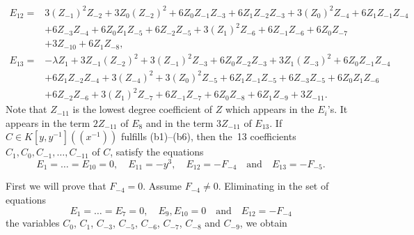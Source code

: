 \documentclass[reqno,a4paper]{amsart}
\theoremstyle{definition}
\theoremstyle{remark}
\begin{document}
\begin{align*}
E_ {12} =& 3 (Z_ {-1})^2 Z_ {-2} + 3 Z_ 0 (Z_ {-2})^2 + 6 Z_ 0 Z_ {-1} Z_ {-3}
+ 6 Z_ 1 Z_ {-2} Z_ {-3} + 3 (Z_ 0)^2 Z_ {-4} + 6 Z_ 1 Z_ {-1} Z_ {-4}\\
& + 6 Z_ {-3} Z_ {-4} +6 Z_ 0 Z_ 1 Z_ {-5}  + 6 Z_ {-2} Z_ {-5}
+ 3 (Z_ 1)^2 Z_ {-6} + 6 Z_ {-1} Z_ {-6} + 6 Z_ 0 Z_ {-7}\\
& +3 Z_ {-10}+ 6 Z_ 1 Z_ {-8},\\
E_ {13} =& -\lambda Z_ 1  + 3 Z_ {-1} (Z_ {-2})^2 + 3 (Z_ {-1})^2 Z_ {-3}
+ 6 Z_ 0 Z_ {-2} Z_ {-3} + 3 Z_ 1 (Z_ {-3})^2 + 6 Z_ 0 Z_ {-1} Z_ {-4}\\
  & + 6 Z_ 1 Z_ {-2} Z_ {-4} + 3 (Z_ {-4})^2
  + 3 (Z_ 0)^2 Z_ {-5} + 6 Z_ 1 Z_ {-1} Z_ {-5} + 6 Z_ {-3} Z_ {-5} + 6 Z_ 0 Z_ 1 Z_ {-6} \\
  & + 6 Z_ {-2} Z_ {-6} + 3 (Z_ 1)^2 Z_ {-7}
  + 6 Z_ {-1} Z_ {-7} + 6 Z_ 0 Z_ {-8} + 6 Z_ 1 Z_ {-9}+ 3 Z_ {-11}.
\end{align*}
Note that $Z_{-11}$ is the lowest degree coefficient of $Z$ which appears in the $E_i$'s.
It appears in the term $2 Z_{-11}$ of $E_8$ and in the term $3 Z_{-11}$ of  $E_{13}$.
If $C\!\in\! K[y,y^{-1}]((x^{-1}))$ fulfills (b1)--(b6), then the~13 coefficients
$C_1,C_0,C_{-1},\dots,C_{-11}$ of $C$, satisfy the equations
\begin{equation}\label{ecuaciones para el caso 13}
E_1=\dots=E_{10} = 0,\quad E_{11}=-y^3,\quad E_{12}=-F_{-4}\quad\text{and}\quad E_{13}=-F_{-5}.
\end{equation}

First we will prove that $F_{-4}=0$. Assume $F_{-4}\ne 0$. Eliminating in the set of equations
$$
E_1=\dots=E_7 = 0,\quad E_9,E_{10} = 0\quad\text{and}\quad E_{12} =-F_{-4}
$$
the variables $C_{0}$, $C_{1}$, $C_{-3}$, $C_{-5}$, $C_{-6}$, $C_{-7}$, $C_{-8}$ and $C_{-9}$, we obtain
\end{document}
